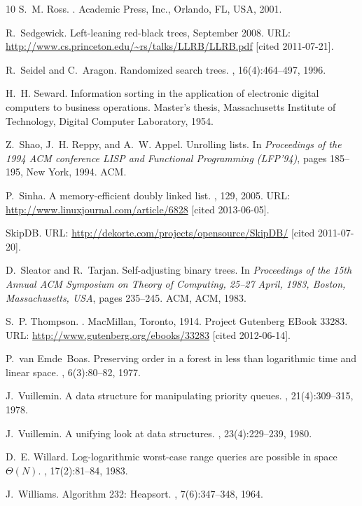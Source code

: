 \documentclass[10pt]{book}
\theoremstyle{plain}
\theoremstyle{definition}
\begin{document}
\begin{thebibliography}{10}
S.~M. Ross.
.
\newblock Academic Press, Inc., Orlando, FL, USA, 2001.

R.~Sedgewick.
\newblock Left-leaning red-black trees, September 2008.
\newblock URL: \url{http://www.cs.princeton.edu/~rs/talks/LLRB/LLRB.pdf} [cited
  2011-07-21].

R.~Seidel and C.~Aragon.
\newblock Randomized search trees.
, 16(4):464--497, 1996.

H.~H. Seward.
\newblock Information sorting in the application of electronic digital
  computers to business operations.
\newblock Master's thesis, Massachusetts Institute of Technology, Digital
  Computer Laboratory, 1954.

Z.~Shao, J.~H. Reppy, and A.~W. Appel.
\newblock Unrolling lists.
\newblock In {\em Proceedings of the 1994 ACM conference LISP and Functional
  Programming (LFP'94)}, pages 185--195, New York, 1994. ACM.

P.~Sinha.
\newblock A memory-efficient doubly linked list.
, 129, 2005.
\newblock URL: \url{http://www.linuxjournal.com/article/6828} [cited
  2013-06-05].

Skip{DB}.
\newblock URL: \url{http://dekorte.com/projects/opensource/SkipDB/} [cited
  2011-07-20].

D.~Sleator and R.~Tarjan.
\newblock Self-adjusting binary trees.
\newblock In {\em Proceedings of the 15th Annual ACM Symposium on Theory of
  Computing, 25--27 April, 1983, Boston, Massachusetts, USA}, pages 235--245.
  ACM, ACM, 1983.

S.~P. Thompson.
.
\newblock MacMillan, Toronto, 1914.
\newblock Project Gutenberg EBook 33283.
\newblock URL: \url{http://www.gutenberg.org/ebooks/33283} [cited 2012-06-14].

P.~van Emde~Boas.
\newblock Preserving order in a forest in less than logarithmic time and linear
  space.
, 6(3):80--82, 1977.

J.~Vuillemin.
\newblock A data structure for manipulating priority queues.
, 21(4):309--315, 1978.

J.~Vuillemin.
\newblock A unifying look at data structures.
, 23(4):229--239, 1980.

D.~E. Willard.
\newblock Log-logarithmic worst-case range queries are possible in space
  {$\Theta(N)$}.
, 17(2):81--84, 1983.

J.~Williams.
\newblock Algorithm 232: Heapsort.
, 7(6):347--348, 1964.

\end{thebibliography}
\end{document}
